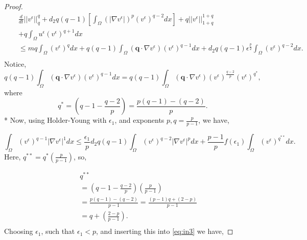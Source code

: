 \documentclass[10pt]{amsart}
\theoremstyle{plain}
\theoremstyle{definition}
\begin{document}
\begin{proof}
\begin{eqnarray}
\label{eq:in3}
&& \frac{d}{dt}||v^{\epsilon}||^{q}_{q}  + d_{2}  q(q-1)[\int_{\Omega} \left(
|\nabla v^{\epsilon}|\right)^{p}(v^{\epsilon})^{q-2} dx ]
+q||v^{\epsilon}||^{1+q}_{1+q} \nonumber \\
&& + q\int_{\Omega}  u^{\epsilon}(v^{\epsilon})^{q+1}dx 
 \nonumber \\
&& 
\leq mq\int_{\Omega} (v^{\epsilon})^{q}dx + q(q-1)\int_{\Omega} (\textbf{q}\cdot \nabla v^{\epsilon}) (v^{\epsilon})^{q-1}dx + d_{2}  q(q-1) \epsilon^{\frac{p}{2}}\int_{\Omega} (v^{\epsilon})^{q-2} dx.
\nonumber \\
\end{eqnarray}
%
Notice,
\begin{equation}
q(q-1)\int_{\Omega} (\textbf{q}\cdot \nabla v^{\epsilon}) (v^{\epsilon})^{q-1}dx = q(q-1)\int_{\Omega} (\textbf{q}\cdot \nabla v^{\epsilon}) (v^{\epsilon})^{\frac{q-2}{p}} (v^{\epsilon})^{q^{*}} ,
\end{equation}
where 
%
\begin{equation}
    q^{*} = \left(q-1 - \frac{q-2}{p}\right)= \frac{p(q-1) -(q-2)}{p}.
\end{equation}
*
Now, using Holder-Young with $\epsilon_{1}$, and exponents $p, q=\frac{p}{p-1}$, we have,

\begin{equation}
\int_{\Omega} (v^{\epsilon})^{q-1}|\nabla v^{\epsilon}|^{1}dx
\leq \frac{\epsilon_{1}}{p} d_{2} q(q-1)\int_{\Omega} (v^{\epsilon})^{q-2}|\nabla v^{\epsilon}|^{p}dx + \frac{p-1}{p}f(\epsilon_{1})\int_{\Omega} (v^{\epsilon})^{q^{**}}dx.
\end{equation}
%
Here, $q^{**} = q^{*}\left(\frac{p}{p-1}\right)$, so,


\begin{eqnarray}
   && q^{**} \nonumber \\
   && = \left(q-1 - \frac{q-2}{p}\right)\left( \frac{p}{p-1}\right)  \nonumber \\
   && = \frac{p(q-1) -(q-2)}{p-1} = \frac{(p-1)q + (2-p)}{p-1}  \nonumber \\
   && = q + \left(\frac{2-p}{p-1}\right).  \nonumber \\
\end{eqnarray}
%
Choosing $\epsilon_{1}$, such that $\epsilon_{1} < p $, and inserting this into \eqref{eq:in3} we have,



\end{proof}
\end{document}
